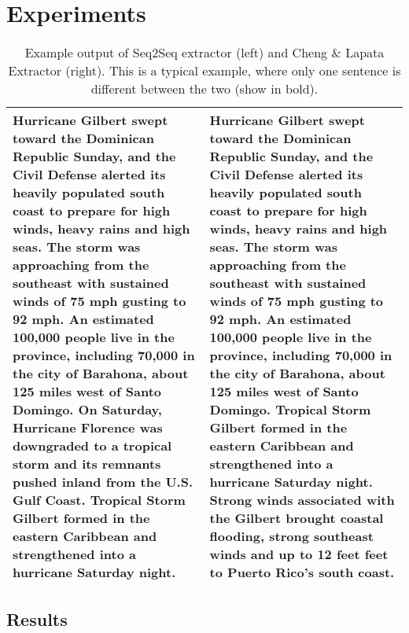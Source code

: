 \documentclass[11pt,a4paper]{article}
\begin{document}
\section{Experiments} \label{sec:exps}


\begin{table*}[ht]
    \footnotesize
\centering
  \begin{tabular}{p{24em} p{24em}}
\toprule
Hurricane Gilbert swept toward the Dominican Republic Sunday, and the 
   Civil Defense alerted its heavily populated south coast to prepare 
   for high winds, heavy rains and high seas.                         
The storm was approaching from the southeast with sustained winds of  
   75 mph gusting to 92 mph.                                          
An estimated 100,000 people live in the province, including 70,000 in 
   the city of Barahona, about 125 miles west of Santo Domingo.       
\textbf{On Saturday, Hurricane Florence was downgraded to a tropical storm and
   its remnants pushed inland from the U.S. Gulf Coast.}               
Tropical Storm Gilbert formed in the eastern Caribbean and            
   strengthened into a hurricane Saturday night.  
&
Hurricane Gilbert swept toward the Dominican Republic Sunday, and the 
   Civil Defense alerted its heavily populated south coast to prepare 
   for high winds, heavy rains and high seas.                         
The storm was approaching from the southeast with sustained winds of  
   75 mph gusting to 92 mph.                                          
An estimated 100,000 people live in the province, including 70,000 in 
   the city of Barahona, about 125 miles west of Santo Domingo.       
Tropical Storm Gilbert formed in the eastern Caribbean and            
   strengthened into a hurricane Saturday night.                      
\textbf{Strong winds associated with the Gilbert brought coastal flooding,    
   strong southeast winds and up to 12 feet feet to Puerto Rico's     
   south coast.}   \\
\bottomrule
\end{tabular}
\caption{Example output of Seq2Seq extractor (left) and Cheng 
\& Lapata Extractor (right). This is a typical example, where only one
 sentence is different between the two (show in bold). }
\label{tab:output}
\end{table*}

\subsection{Results} 

\end{document}
